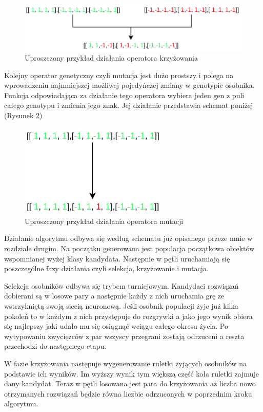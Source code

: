 \documentclass[12pt, oneside, a4paper]{report}
\begin{document}
\begin{figure}[h]
	\centering
	\includegraphics[width=14cm]{fig431.png}
	\caption{Uproszczony przykład działania operatora krzyżowania}
	\label{fig: 4.3.crossing}
\end{figure}
\newpage

Kolejny operator genetyczny czyli mutacja jest dużo prostszy i polega na wprowadzeniu najmniejszej możliwej pojedyńczej zmiany w genotypie osobnika. Funkcja odpowiadająca za działanie tego operatora wybiera jeden gen z puli całego genotypu i zmienia jego znak. Jej działanie przedstawia schemat poniżej (Rysunek \ref{fig: 4.3.mutation})

\begin{figure}[h]
	\centering
	\includegraphics[width=7cm]{fig432.png}
	\caption{Uproszczony przykład działania operatora mutacji}
	\label{fig: 4.3.mutation}
\end{figure}

Działanie algorytmu odbywa się według schematu już opisanego przeze mnie w rozdziale drugim. Na początku generowana jest populacja początkowa obiektów wspomnianej wyżej klasy kandydata. Następnie w pętli uruchamiają się poszczególne fazy działania czyli selekcja, krzyżowanie i mutacja.

Selekcja osobników odbywa się trybem turniejowym. Kandydaci rozwiązań dobierani są w losowe pary a następnie każdy z nich uruchamia grę ze wstrzykniętą swoją siecią neuronową. Jeśli osobnik populacji żyje już kilka pokoleń to w każdym z nich przystępuje do rozgrywki a jako jego wynik obiera się najlepszy jaki udało mu się osiągnąć wciągu całego okresu życia. Po wytypowaniu zwycięzców z par wszyscy przegrani zostają odrzuceni a reszta przechodzi do następnego etapu.

W fazie krzyżowania następuje wygenerowanie ruletki żyjących osobników na podstawie ich wyników. Im wyższy wynik tym większą część koła ruletki zajmuje dany kandydat. Teraz w pętli losowana jest para do krzyżowania aż liczba nowo otrzymanych rozwiązań będzie równa liczbie odrzuconych w poprzednim kroku algorytmu.
\end{document}
